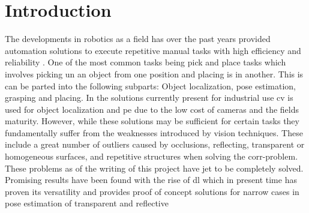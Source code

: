 \chapter{Introduction} \label{ch:intro}


The developments in robotics as a field has over the past years provided automation solutions to execute repetitive manual tasks with high efficiency and reliability \fakecite. One of the most common tasks being pick and place tasks which involves picking un an object from one position and placing is in another. This is can be parted into the following subparts: Object localization, pose estimation, grasping and placing. In the solutions currently present for industrial use \gls{cv} is used for object localization and \gls{pe} due to the low cost of cameras and the fields maturity. However, while these solutions may be sufficient for certain tasks they fundamentally suffer from the weaknesses introduced by vision techniques. These include a great number of outliers caused by occlusions, reflecting, transparent or homogeneous surfaces, and repetitive structures when solving the \gls{corr-problem}. These problems as of the writing of this project have jet to be completely solved. Promising results have been found with the rise of \gls{dl} which in present time has proven its versatility and provides proof of concept solutions for narrow cases in pose estimation of transparent \cite{6dof-pose-estimation-of-transparent-object-from-a-single-rgb-d-image} and reflective \medskip

